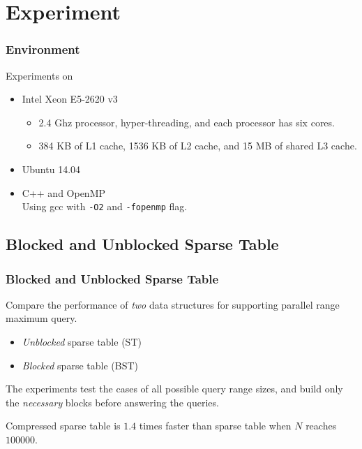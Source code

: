 \section{Experiment}

\begin{frame}
	\frametitle{Environment}
	Experiments on 
	\begin{itemize}
		\setlength\itemsep{1em}
		\item
			Intel Xeon E5-2620 v3
			\begin{itemize}
				\setlength\itemsep{1em}
				\item
					2.4 Ghz processor, hyper-threading, and each
					processor has six cores.
				\item
					384 KB of L1 cache, 1536 KB of L2 cache, and 15 MB
					of shared L3 cache.
			\end{itemize}
		\item 
			Ubuntu 14.04
		\item
			C++ and OpenMP \\
			Using gcc with {\tt -O2} and {\tt -fopenmp} flag.
	\end{itemize}
\end{frame}

\subsection{Blocked and Unblocked Sparse Table}
\begin{frame}
    \frametitle{Blocked and Unblocked Sparse Table}
    Compare the performance of {\em two} data structures for supporting
	parallel range maximum query.

	\begin{itemize}
		\item 
			{\em Unblocked} sparse table ({\sc ST})
		\item 
			{\em Blocked} sparse table ({\sc BST})
	\end{itemize}
	\vspace{1em}
	The experiments test the cases of all possible query range sizes,
	and build only the {\em necessary} blocks before answering the
	queries.
\end{frame}

\begin{frame}
	Compressed sparse table is $1.4$ times faster than sparse table when
	$N$ reaches $100000$.
	\begin{center}
	\scalebox{0.65} { \begin{minipage}{1.53\textwidth}
			
			\end{minipage}
		}
	\end{center}
\end{frame}

